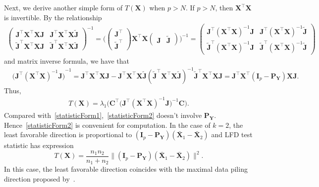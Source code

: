 \documentclass[12pt]{article} %
\newcommand{\bA}{\mathbf{A}}
\newcommand{\bX}{\mathbf{X}}
\newcommand{\bP}{\mathbf{P}}
\newcommand{\bY}{\mathbf{Y}}
\newcommand{\bJ}{\mathbf{J}}
\newcommand{\bC}{\mathbf{C}}
\newcommand{\bI}{\mathbf{I}}
\theoremstyle{definition}
\begin{document}
Next, we derive another simple form of $T(\bX)$ when $p>N$.
If $p>N$, then $\bX^\top \bX$ is invertible.
By the relationship
\begin{equation*}
    \begin{aligned}
        \begin{pmatrix}
            \bJ^\top \bX^\top \bX\bJ & \bJ^\top \bX^\top \bX\tilde{\bJ}\\
            \tilde{\bJ}^\top \bX^\top \bX \bJ & \tilde{\bJ}^\top \bX^\top \bX \tilde{\bJ}
        \end{pmatrix}^{-1}
        =
        \Big(
        \begin{pmatrix}
            \bJ^\top\\
            \tilde{\bJ}^\top
        \end{pmatrix}
        \bX^\top \bX
        \begin{pmatrix}
            \bJ &\tilde{\bJ}
        \end{pmatrix}
        \Big)^{-1}
        =
        \begin{pmatrix}
            \bJ^\top {(\bX^\top \bX)}^{-1}\bJ & \bJ^\top {(\bX^\top \bX)}^{-1}\tilde{\bJ}\\
            \tilde{\bJ}^\top {(\bX^\top \bX)}^{-1}\bJ & \tilde{\bJ}^\top {(\bX^\top \bX)}^{-1} \tilde{\bJ}
        \end{pmatrix}
    \end{aligned}
\end{equation*}
and matrix inverse formula, we have that
\begin{equation*}
    \begin{aligned}
        &{\big( \bJ^\top {(\bX^\top \bX)}^{-1}\bJ \big)}^{-1}
        =\bJ^\top \bX^\top \bX \bJ - \bJ^\top \bX^\top \bX\tilde{\bJ}{(\tilde{\bJ}^\top \bX^\top \bX \tilde{\bJ})}^{-1}
            \tilde{\bJ}^\top \bX^\top \bX\bJ 
        = \bJ^\top \bX^\top( \bI_p- \bP_{\bY}) \bX \bJ.
    \end{aligned}
\end{equation*}
Thus, 
\begin{equation}\label{statisticForm2}
    \begin{aligned}
        T(\bX)=
        \lambda_1 \Big(\bC^\top\big( \bJ^\top (\bX^\top \bX)^{-1}\bJ \big)^{-1}\bC\Big).
    \end{aligned}
\end{equation}
Compared with~\eqref{statisticForm1},~\eqref{statisticForm2} doesn't involve $\bP_{\bY}$.
Hence~\eqref{statisticForm2} is convenient for computation.
In the case of $k=2$, the least favorable direction is proportional to
$
(\bI_p-\bP_{\bY}) (\bar{\bX}_1-\bar{\bX}_2)
$ and LFD test statistic has expression
$$
T(\bX)=\frac{n_1 n_2}{n_1+n_2}\| (\bI_p-\bP_{\bY}) (\bar{\bX}_1-\bar{\bX}_2)\|^2.
$$
In this case, 
the least favorable direction coincides with the maximal data piling direction proposed by~\cite{Ahn2010}.
\end{document}
